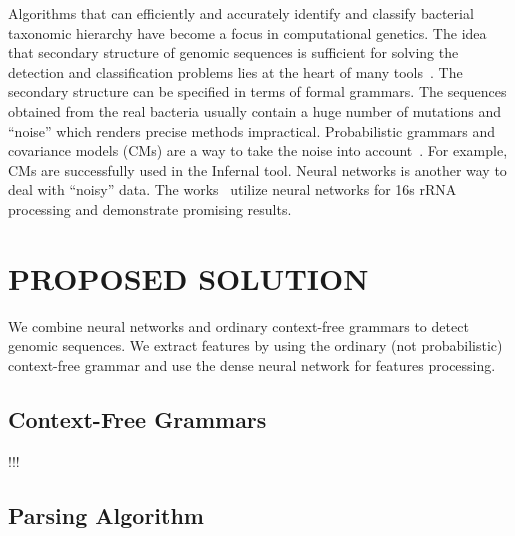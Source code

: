 \documentclass[a4paper,twoside]{article}
\begin{document}
\noindent Algorithms that can efficiently and accurately identify and classify bacterial taxonomic hierarchy have become a focus in computational genetics.
The idea that secondary structure of genomic sequences is sufficient for solving the detection and classification problems lies at the heart of many tools~\cite{GrammarsRNA,PCFG,meta,LWPCFG}. 
The secondary structure can be specified in terms of formal grammars. 
The sequences obtained from the real bacteria usually contain a huge number of mutations and ``noise'' which renders precise methods impractical. 
Probabilistic grammars and covariance models (CMs) are a way to take the noise into account~\cite{EddyDurbin}.
For example, CMs are successfully used in the Infernal tool.%
Neural networks is another way to deal with ``noisy'' data. 
The works~\cite{Humidor,ANN} utilize neural networks for 16s rRNA processing and demonstrate promising results. 
%

\section{\uppercase{Proposed solution}}
\label{sec:proposedSolution}

\noindent We combine neural networks and ordinary context-free grammars to detect genomic sequences. 
We extract features by using the ordinary (not probabilistic) context-free grammar and use the dense neural network for features processing.


\subsection{Context-Free Grammars}

\noindent !!!

\subsection{Parsing Algorithm}
\end{document}
